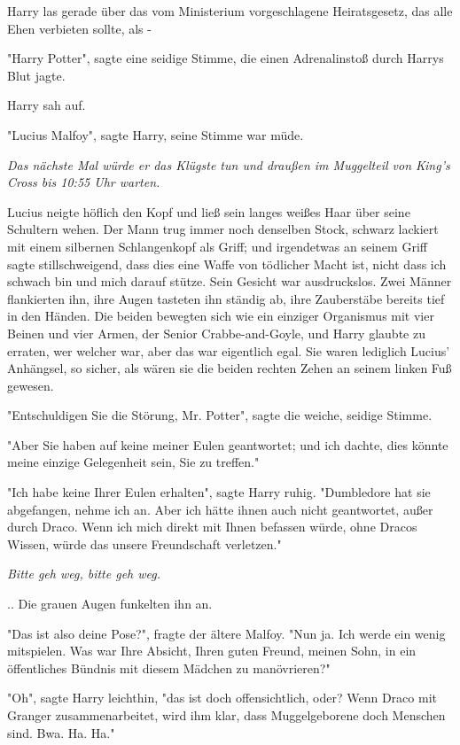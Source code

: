 {Harry las gerade über das vom Ministerium vorgeschlagene Heiratsgesetz, das alle Ehen verbieten sollte, als -

"Harry Potter", sagte eine seidige Stimme, die einen Adrenalinstoß durch Harrys Blut jagte.

Harry sah auf.

"Lucius Malfoy", sagte Harry, seine Stimme war müde.

\emph{Das nächste Mal würde er das Klügste tun und draußen im Muggelteil von King's Cross bis 10:55 Uhr warten.}

Lucius neigte höflich den Kopf und ließ sein langes weißes Haar über seine Schultern wehen. Der Mann trug immer noch denselben Stock, schwarz lackiert mit einem silbernen Schlangenkopf als Griff; und irgendetwas an seinem Griff sagte stillschweigend, dass dies eine Waffe von tödlicher Macht ist, nicht dass ich schwach bin und mich darauf stütze. Sein Gesicht war ausdruckslos. Zwei Männer flankierten ihn, ihre Augen tasteten ihn ständig ab, ihre Zauberstäbe bereits tief in den Händen. Die beiden bewegten sich wie ein einziger Organismus mit vier Beinen und vier Armen, der Senior Crabbe-and-Goyle, und Harry glaubte zu erraten, wer welcher war, aber das war eigentlich egal. Sie waren lediglich Lucius' Anhängsel, so sicher, als wären sie die beiden rechten Zehen an seinem linken Fuß gewesen.

"Entschuldigen Sie die Störung, Mr. Potter", sagte die weiche, seidige Stimme.

"Aber Sie haben auf keine meiner Eulen geantwortet; und ich dachte, dies könnte meine einzige Gelegenheit sein, Sie zu treffen."

"Ich habe keine Ihrer Eulen erhalten", sagte Harry ruhig. "Dumbledore hat sie abgefangen, nehme ich an. Aber ich hätte ihnen auch nicht geantwortet, außer durch Draco. Wenn ich mich direkt mit Ihnen befassen würde, ohne Dracos Wissen, würde das unsere Freundschaft verletzen."

\emph{Bitte geh weg, bitte geh weg.}

.. Die grauen Augen funkelten ihn an.

"Das ist also deine Pose?", fragte der ältere Malfoy. "Nun ja. Ich werde ein wenig mitspielen. Was war Ihre Absicht, Ihren guten Freund, meinen Sohn, in ein öffentliches Bündnis mit diesem Mädchen zu manövrieren?"

"Oh", sagte Harry leichthin, "das ist doch offensichtlich, oder? Wenn Draco mit Granger zusammenarbeitet, wird ihm klar, dass Muggelgeborene doch Menschen sind. Bwa. Ha. Ha."

}

